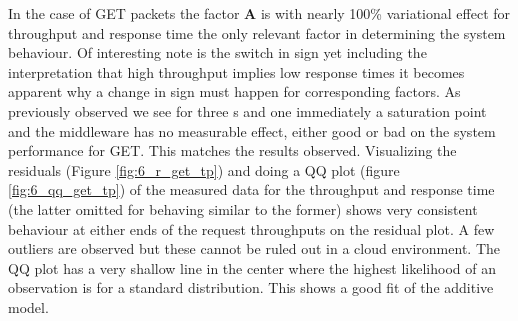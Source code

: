     In the case of GET packets the factor \textbf{A} is with nearly 100\% variational effect for throughput and
    response time the only relevant factor in determining the system behaviour. Of interesting note is the switch in
    sign yet including the interpretation that high throughput implies low response times it becomes apparent why a
    change in sign must happen for corresponding factors. As previously observed we see for three \cli{}s and one
    \srv{} immediately a saturation point and the middleware has no measurable effect, either good or bad on the
    system performance for GET. This matches the results observed. Visualizing the residuals (Figure
    \ref{fig:6_r_get_tp}) and doing a QQ plot (figure \ref{fig:6_qq_get_tp}) of the measured data for the
    throughput and response time (the latter omitted for behaving similar to the former) shows very consistent
    behaviour at either ends of the request throughputs on the residual plot. A few outliers are observed but these
    cannot be ruled out in a cloud environment. The QQ plot has a very shallow line in the center where the highest
    likelihood of an observation is for a standard distribution. This shows a good fit of the additive model.

